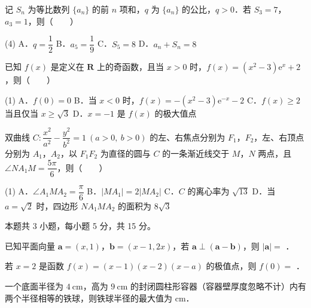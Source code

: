 \begin{question}
记 $S_n$ 为等比数列 $\{a_n\}$ 的前 $n$ 项和，$q$ 为 $\{a_n\}$ 的公比，$q>0$．若 $S_3=7$，$a_3=1$，则（　　）

\begin{gkopts}(4)
\task A．$q=\dfrac12$
\task B．$a_5=\dfrac19$
\task C．$S_5=8$
\task D．$a_n+S_n=8$
\end{gkopts}

\end{question}
\begin{question}
已知 $f(x)$ 是定义在 $\mathbf{R}$ 上的奇函数，且当 $x>0$ 时，$f(x)=\left(x^2-3\right)\mathrm{e}^{x}+2$，则（　　）

\begin{gkopts}(1)
\task A．$f(0)=0$
\task B．当 $x<0$ 时，$f(x)=-\left(x^2-3\right)\mathrm{e}^{-x}-2$
\task C．$f(x)\ge 2$ 当且仅当 $x\ge\sqrt3$
\task D．$x=-1$ 是 $f(x)$ 的极大值点
\end{gkopts}

\end{question}
\begin{question}
双曲线 $C:\dfrac{x^2}{a^2}-\dfrac{y^2}{b^2}=1\ (a>0,\ b>0)$ 的左、右焦点分别为 $F_1$，$F_2$，左、右顶点分别为 $A_1$，$A_2$，以 $F_1F_2$ 为直径的圆与 $C$ 的一条渐近线交于 $M$，$N$ 两点，且 $\angle NA_1M=\dfrac{5\pi}{6}$，则（　　）

\begin{gkopts}(1)
\task A．$\angle A_1MA_2=\dfrac{\pi}{6}$
\task B．$|MA_1|=2|MA_2|$
\task C．$C$ 的离心率为 $\sqrt{13}$
\task D．当 $a=\sqrt2$ 时，四边形 $NA_1MA_2$ 的面积为 $8\sqrt3$
\end{gkopts}

\par\medskip

\end{question}

\begin{gktip}
本题共 3 小题，每小题 5 分，共 15 分。
\end{gktip}

\begin{question}
已知平面向量 $\boldsymbol{a}=(x,1)$，$\boldsymbol{b}=(x-1,2x)$，若 $\boldsymbol{a}\perp(\boldsymbol{a}-\boldsymbol{b})$，则 $|\boldsymbol{a}|=$ \gkblank{}．

\end{question}
\begin{question}
若 $x=2$ 是函数 $f(x)=(x-1)(x-2)(x-a)$ 的极值点，则 $f(0)=$ \gkblank{}．

\end{question}
\begin{question}
一个底面半径为 $4\ \mathrm{cm}$，高为 $9\ \mathrm{cm}$ 的封闭圆柱形容器（容器壁厚度忽略不计）内有两个半径相等的铁球，则铁球半径的最大值为 \gkblank{} $\mathrm{cm}$．

\par\medskip

\end{question}

